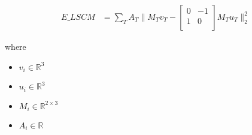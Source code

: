 \documentclass[12pt]{article}
\begin{document}
\begin{align*}
\textit{E\_LSCM} & = \sum_\textit{T} \textit{A}_{ \textit{T} }\|\textit{M}_{ \textit{T} }\textit{v}_{ \textit{T} } - \begin{bmatrix}
0 & -1\\
1 & 0\\
\end{bmatrix}\textit{M}_{ \textit{T} }\textit{u}_{ \textit{T} }\|_2^{2}
\end{align*}

where
\begin{itemize}
\item $\textit{v}_{\textit{i}} \in \mathbb{R}^{ 3}$
\item $\textit{u}_{\textit{i}} \in \mathbb{R}^{ 3}$
\item $\textit{M}_{\textit{i}} \in \mathbb{R}^{ 2 \times 3 }$
\item $\textit{A}_{\textit{i}} \in \mathbb{{R}}$
\end{itemize}
\end{document}
